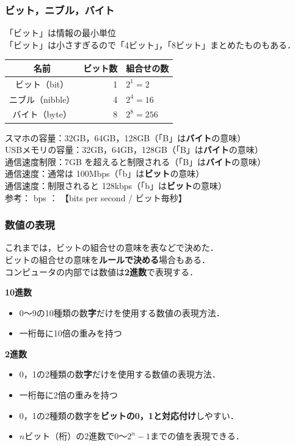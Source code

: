 \documentclass[handout]{beamer}        %
\begin{document}
\begin{frame}
  \frametitle{ビット，ニブル，バイト}
  「ビット」は情報の最小単位 \\
  「ビット」は小さすぎるので「4ビット」，「8ビット」まとめたものもある．

  \begin{center}
    \begin{tabular}{c|r|l} \hline\hline
      名前 & ビット数 & 組合せの数\\
      \hline
      ビット（bit）    & 1   & $2^1 = 2$ \\
      ニブル（nibble） & 4   & $2^4 = 16$ \\
      バイト（byte） & 8   & $2^8 = 256$ \\
    \end{tabular}
  \end{center}

  スマホの容量：32GB，64GB，128GB（「B」は{\bf バイト}の意味） \\
  USBメモリの容量：32GB，64GB，128GB（「B」は{\bf バイト}の意味） \\
  通信速度制限：7GB を超えると制限される（「B」は{\bf バイト}の意味） \\
  通信速度：通常は 100Mbps（「b」は{\bf ビット}の意味） \\
  通信速度：制限されると 128kbps（「b」は{\bf ビット}の意味） \\

  参考： bps ： 【bits per second / ビット毎秒】
\end{frame}

\begin{frame}
  \frametitle{数値の表現}
  これまでは，ビットの組合せの意味を表などで決めた． \\
  ビットの組合せの意味を{\bf ルールで決める}場合もある．\\
  コンピュータの内部では数値は{\bf 2進数}で表現する．

  {\bf 10進数} \\
  \begin{itemize}
    \item 0〜9の10種類の数{\bf 字}だけを使用する数値の表現方法．
    \item 一桁毎に10倍の重みを持つ
  \end{itemize}

  {\bf 2進数} \\
  \begin{itemize}
    \item 0，1の2種類の数{\bf 字}だけを使用する数値の表現方法．
    \item 一桁毎に2倍の重みを持つ
    \item 0，1の2種類の数字を{\bf ビットの0，1と対応付け}しやすい．
    \item $n$ビット（桁）の2進数で$0$〜$2^n-1$までの値を表現できる．
  \end{itemize}

\end{frame}
\end{document}
